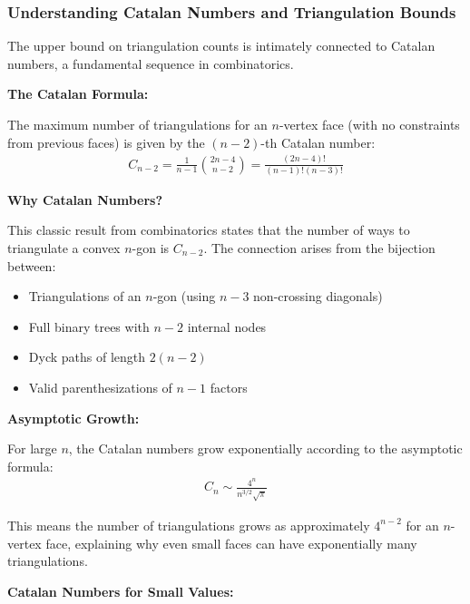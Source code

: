 \documentclass[12pt,a4paper]{article}
\theoremstyle{definition}
\theoremstyle{remark}
\begin{document}
\subsubsection{Understanding Catalan Numbers and Triangulation Bounds}

The upper bound on triangulation counts is intimately connected to Catalan numbers, a fundamental sequence in combinatorics.

\textbf{The Catalan Formula:}

The maximum number of triangulations for an $n$-vertex face (with no constraints from previous faces) is given by the $(n-2)$-th Catalan number:
\begin{align}
C_{n-2} = \frac{1}{n-1} \binom{2n-4}{n-2} = \frac{(2n-4)!}{(n-1)!(n-3)!}
\end{align}

\textbf{Why Catalan Numbers?}

This classic result from combinatorics states that the number of ways to triangulate a convex $n$-gon is $C_{n-2}$. The connection arises from the bijection between:
\begin{itemize}
    \item Triangulations of an $n$-gon (using $n-3$ non-crossing diagonals)
    \item Full binary trees with $n-2$ internal nodes
    \item Dyck paths of length $2(n-2)$
    \item Valid parenthesizations of $n-1$ factors
\end{itemize}

\textbf{Asymptotic Growth:}

For large $n$, the Catalan numbers grow exponentially according to the asymptotic formula:
\begin{align}
C_n \sim \frac{4^n}{n^{3/2}\sqrt{\pi}}
\end{align}

This means the number of triangulations grows as approximately $4^{n-2}$ for an $n$-vertex face, explaining why even small faces can have exponentially many triangulations.

\textbf{Catalan Numbers for Small Values:}
\end{document}
